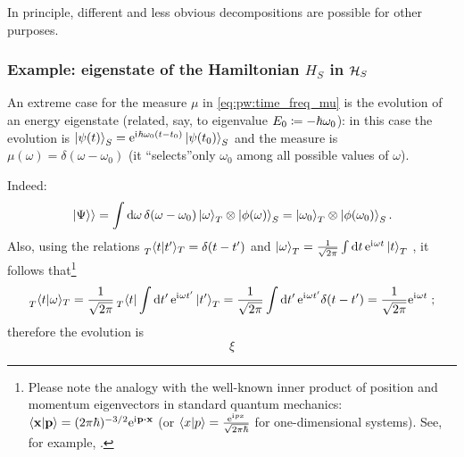 In principle, different and less obvious decompositions are possible for other purposes.

\subsubsection{Example: eigenstate of the Hamiltonian $H_S$ in $\mathcal{H}_S$}

An extreme case for the measure $\mu$ in \eqref{eq:pw:time_freq_mu}
is the evolution of an energy eigenstate
(related, say, to eigenvalue $E_0 \coloneqq -\hbar\omega_{0}$): in this case the evolution is
$\ket{\psi(t)}_{S} = \mathrm{e}^{\mathrm{i}\mkern1mu\hbar\omega_{0}(t-t_{0})} \ket{\psi(t_0)}_{S}$
and
the measure is
$\mu(\omega) = \delta(\omega-\omega_0)$
(it  ``selects''only $\omega_0$ among all possible values
of $\omega$).

Indeed:
\[
  \left.\left| \Psi \right\rangle\right\rangle = \int \dd{\omega} \delta(\omega-\omega_0)\ket{\omega}_T \otimes \ket{\phi(\omega)}_S =
    \ket{\omega_0}_T \otimes \ket{\phi(\omega_0)}_S \text{.}
\]
Also, using the relations
$
\prescript{}{T}{\braket{t}{t'}}_T = \delta(t-t')
$
and
$
  \ket{\omega}_T =
  \frac{1}{\sqrt{2\pi}} \int\dd{t}\mathrm{e}^{\mathrm{i}\mkern1mu\omega t}\ket{t}_T
$
\parencite{Lloyd:Time},
it follows that\footnote{%
  Please note the analogy with the well-known
  inner product of position and momentum eigenvectors in standard quantum mechanics:
  $\braket{\vb{x}}{\vb{p}} = (2\pi\hbar)^{-3/2}\E^{\iu \vb{p} \vdot \vb{x}}$
  (or $\braket{x}{p} = \frac{\mathrm{e}^{\mathrm{i}\mkern1mu p x}}{\sqrt{2\pi\hbar}}$ for one-dimensional systems).
  See, for example, \cite[126--127]{Ballentine}.
}
\[
  \prescript{}{T}{\braket{t}{\omega}}_T =
  \frac{1}{\sqrt{2\pi}}\prescript{}{T}{\bra{t}} \int\dd{t'}\mathrm{e}^{\mathrm{i}\mkern1mu\omega t'}\ket{t'}_T  =
  \frac{1}{\sqrt{2\pi}}\int\dd{t'}\mathrm{e}^{\mathrm{i}\mkern1mu\omega t'}\delta(t-t') =
  \frac{1}{\sqrt{2\pi}} \mathrm{e}^{\mathrm{i}\mkern1mu\omega t} \; \text{;}
\]
therefore the evolution is
\[
  \xi
\]






